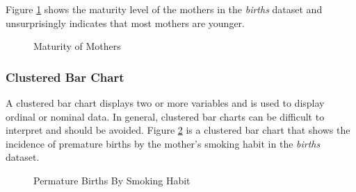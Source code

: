 Figure \ref{lab02_fig10} shows the maturity level of the mothers in the \textit{births} dataset and unsurprisingly indicates that most mothers are younger.

\begin{figure}[H]
  \begin{center}
    \caption{Maturity of Mothers}
    \label{lab02_fig10}
  \end{center}
\end{figure}

\subsubsection{Clustered Bar Chart} A clustered bar chart displays two or more variables and is used to display ordinal or nominal data. In general, clustered bar charts can be difficult to interpret and should be avoided. Figure \ref{lab02_fig11} is a clustered bar chart that shows the incidence of premature births by the mother's smoking habit in the \textit{births} dataset.

\begin{figure}[H]
  \begin{center}
    \caption{Permature Births By Smoking Habit}
    \label{lab02_fig11}
  \end{center}
\end{figure}


